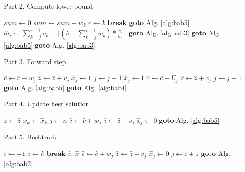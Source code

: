 \documentclass[conference]{IEEEtran}
\begin{document}
\begin{algorithm}
	\caption{Part 2. Compute lower bound} \label{alg:bab2}
	\begin{algorithmic}[1]
		\State $sum \gets 0$
			\State $sum \gets sum + w_{k}$
					\State $r \gets k$
					\State \textbf{break}
				\EndIf
		\EndFor
			\State \textbf{goto} Alg. \ref{alg:bab5}
		\EndIf
		\State $lb_j \gets \sum^{r-1}_{k=j}v_{k} + \lfloor (\hat{c} - \sum^{r-1}_{k=j}w_k)*\frac{v_r}{w_{r}} \rfloor$
			\State \textbf{goto} Alg. \ref{alg:bab3}
		\EndIf
			\State \textbf{goto} Alg. \ref{alg:bab5}
		\EndIf
		\State \textbf{goto} Alg. \ref{alg:bab3}
	\end{algorithmic}
\end{algorithm}

\begin{algorithm}
	\caption{Part 3. Forward step} \label{alg:bab3}
	\begin{algorithmic}[1]
			\State $\hat{c} \gets \hat{c} - w_j$
			\State $\hat{z} \gets \hat{z} + v_j$
			\State $\hat{x}_j \gets 1$
			\State $j \gets j + 1$
		\EndWhile
			\State $\hat{x}_j \gets 1$
			\State $\hat{c} \gets \hat{c} - U_j$
			\State $\hat{z} \gets \hat{z} + v_j$
			\State $j \gets j + 1$
		\EndIf
			\State \textbf{goto} Alg. \ref{alg:bab5}
		\EndIf
		\State \textbf{goto} Alg. \ref{alg:bab4}
	\end{algorithmic}
\end{algorithm}

\begin{algorithm}
	\caption{Part 4. Update best solution} \label{alg:bab4}
	\begin{algorithmic}[1]
			\State $z \gets \hat{z}$
				\State $x_k \gets \hat{x}_k$
			\EndFor
		\EndIf
		\State $j \gets n$
			\State $\hat{c} \gets \hat{c} + w_j$
			\State $\hat{z} \gets \hat{z} - v_j$
			\State $\hat{x}_j \gets 0$
		\EndIf
		\State \textbf{goto} Alg. \ref{alg:bab5}
	\end{algorithmic}
\end{algorithm}

\begin{algorithm}
	\caption{Part 5. Backtrack} \label{alg:bab5}
	\begin{algorithmic}[1]
		\State $i \gets -1$
				\State $i \gets k$
				\State \textbf{break}
			\EndIf
		\EndFor
			\State \Return $\hat{z}$, $\hat{x}$
		\EndIf
		\State $\hat{c} \gets \hat{c} + w_j$
		\State $\hat{z} \gets \hat{z} - v_j$
		\State $\hat{x}_j \gets 0$
		\State $j \gets i + 1$
		\State \textbf{goto} Alg. \ref{alg:bab2}
	\end{algorithmic}
\end{algorithm}
\end{document}
